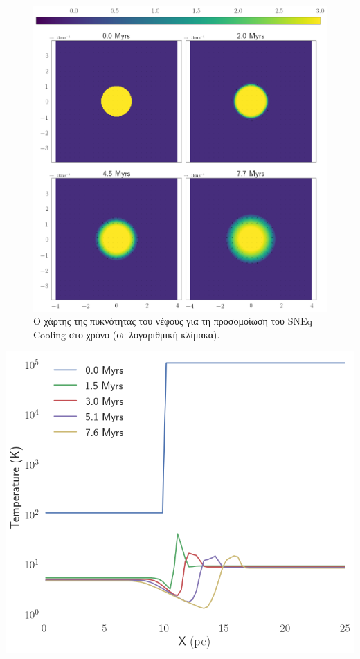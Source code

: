 			\begin{figure}
				\includegraphics[width=1\linewidth]{DataImages/SNCoolingRHOquad}
				\caption{Ο χάρτης της πυκνότητας του νέφους για τη προσομοίωση του SNEq Cooling στο χρόνο (σε λογαριθμική κλίμακα).}
				\label{fig:sncoolingrhoquad}
			\end{figure}
		
\begin{marginfigure}
	\centering
	\includegraphics[width=1\linewidth]{DataImages/SNCoolingTMPprofile}
	\caption{}
	\label{fig:sncoolingtmpprofile}
\end{marginfigure}

